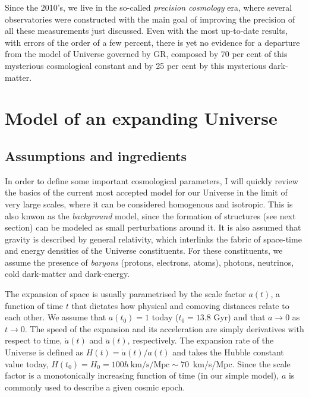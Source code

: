     Since the 2010's, we live in the so-called \emph{precision cosmology} era,
    where several observatories were constructed with the main goal of
    improving the precision of all these measurements just discussed. 
    Even with the most up-to-date results, with errors of the order of a few percent,
    there is yet no evidence for a departure from the model of Universe 
    governed by GR, composed by 70 per cent of this mysterious cosmological 
    constant and by 25 per cent by this mysterious dark-matter. 

\section{Model of an expanding Universe}
\label{intro:model}

    \subsection{Assumptions and ingredients}
    \label{intro:model:ingredients}

    In order to define some important cosmological parameters, I will quickly review
    the basics of the current most accepted model for our Universe in the limit of 
    very large scales, where it can be considered homogenous and isotropic. 
    This is also knwon as the \emph{background} model, since the formation of structures 
    (see next section) can
    be modeled as small perturbations around it. It is also assumed that gravity is 
    described by general relativity, which interlinks the fabric of space-time and 
    energy densities of the Universe constituents. For these constituents, we assume 
    the presence of \emph{baryons} (protons, electrons, atoms), 
    photons, neutrinos, cold dark-matter and dark-energy. 

    The expansion of space is usually parametrised by the scale factor $a(t)$, 
    a function of time $t$ that dictates how physical and comoving distances 
    relate to each other. We assume that $a(t_0) = 1$ today ($t_0 = 13.8$ Gyr) 
    and that $a \rightarrow 0$ as $t \rightarrow 0$. The speed of the expansion
    and its acceleration are simply derivatives with respect to time, $\dot{a}(t)$ 
    and $\ddot{a}(t)$, respectively. The expansion rate of the Universe is defined
    as $H(t) = \dot{a}(t)/a(t)$ and takes the Hubble constant value today, 
    $H(t_0) = H_0 = 100 h ~ \mathrm{km/s/Mpc} \sim 70$~km/s/Mpc. 
    Since the scale factor is a monotonically increasing function of time 
    (in our simple model), $a$ is commonly used to describe a given cosmic epoch. 

